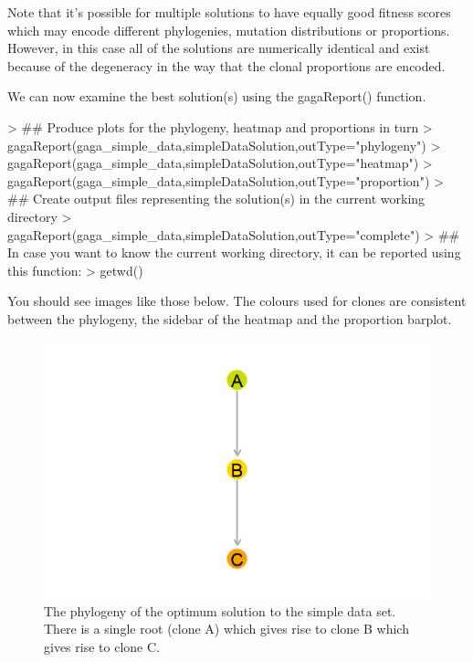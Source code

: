 \documentclass{article}
\begin{document}
Note that it's possible for multiple solutions to have equally good fitness scores which may encode different phylogenies, mutation distributions or proportions.  However, in this case all of the solutions are numerically identical and exist because of the degeneracy in the way that the clonal proportions are encoded.

We can now examine the best solution(s) using the gagaReport() function.  

\begin{Schunk}
\begin{Sinput}
> ## Produce plots for the phylogeny, heatmap and proportions in turn
> gagaReport(gaga_simple_data,simpleDataSolution,outType="phylogeny")
> gagaReport(gaga_simple_data,simpleDataSolution,outType="heatmap")
> gagaReport(gaga_simple_data,simpleDataSolution,outType="proportion")
> ## Create output files representing the solution(s) in the current working directory
> gagaReport(gaga_simple_data,simpleDataSolution,outType="complete")
> ## In case you want to know the current working directory, it can be reported using this function:
> getwd()
\end{Sinput}
\end{Schunk}

You should see images like those below.  The colours used for clones are consistent between the phylogeny, the sidebar of the heatmap and the proportion barplot.

\begin{figure}[H]
    \centering
    \includegraphics{gaga_simple_data_phylogeny.png}
    \caption{The phylogeny of the optimum solution to the simple data set.  There is a single root (clone A) which gives rise to clone B which gives rise to clone C.}
\end{figure}
\end{document}
